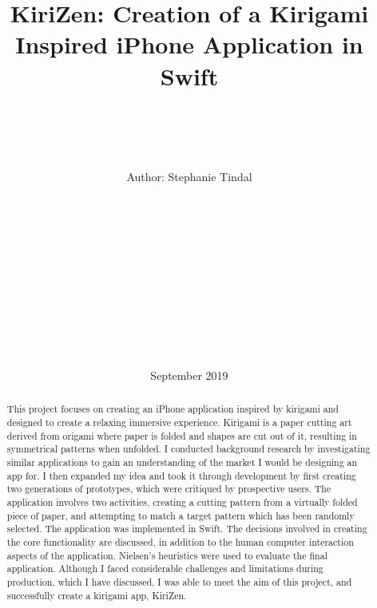 \documentclass[11pt]{article}
\begin{document}
\begin{titlepage}
    \title{\vspace{40pt}\Huge KiriZen: Creation of a Kirigami Inspired iPhone Application in Swift}

    \author{ \\\hline \\\\\\ \Large \vspace{5pt} Author: Stephanie Tindal \\\Large \vspace{5pt}{Student ID: 1936508}\\\Large \vspace{50pt}{Supervisor: Achim Jung} \\ \hline\\\\\\  \vspace{5pt}{MSc Computer Science} \\ \vspace{5pt}{School of Computer Science, University of Birmingham}\\\\\\ \hline\\\\}

    \date{September 2019 \vspace{20pt}}
    \maketitle

\end{titlepage}
    \tableofcontents
\newpage

\begin{abstract}
    This project focuses on creating an iPhone application inspired by kirigami and designed to create a relaxing immersive experience. Kirigami is a paper cutting art derived from origami where paper is folded and shapes are cut out of it, resulting in symmetrical patterns when unfolded. I conducted background research by investigating similar applications to gain an understanding of the market I would be designing an app for. I then expanded my idea and took it through development by first creating two generations of prototypes, which were critiqued by prospective users. The application involves two activities, creating a cutting pattern from a virtually folded piece of paper, and attempting to match a target pattern which has been randomly selected. The application was implemented in Swift. The decisions involved in creating the core functionality are discussed, in addition to the human computer interaction aspects of the application. Nielsen's heuristics were used to evaluate the final application. Although I faced considerable challenges and limitations during production, which I have discussed, I was able to meet the aim of this project, and successfully create a kirigami app, KiriZen.

\end{abstract}
\end{document}
